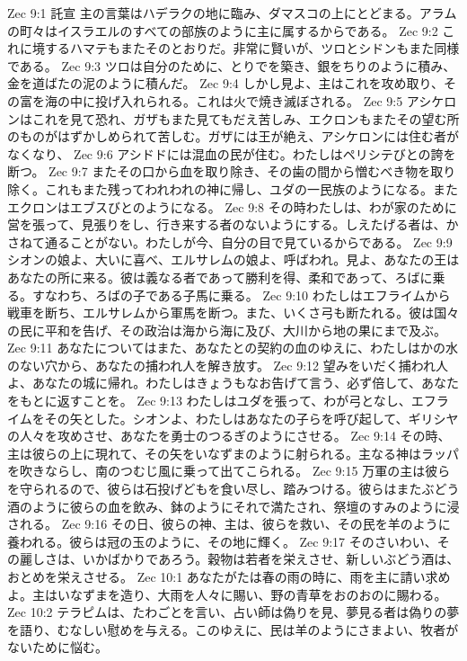 Zec 9:1  託宣 主の言葉はハデラクの地に臨み、ダマスコの上にとどまる。アラムの町々はイスラエルのすべての部族のように主に属するからである。
Zec 9:2  これに境するハマテもまたそのとおりだ。非常に賢いが、ツロとシドンもまた同様である。
Zec 9:3  ツロは自分のために、とりでを築き、銀をちりのように積み、金を道ばたの泥のように積んだ。
Zec 9:4  しかし見よ、主はこれを攻め取り、その富を海の中に投げ入れられる。これは火で焼き滅ぼされる。
Zec 9:5  アシケロンはこれを見て恐れ、ガザもまた見てもだえ苦しみ、エクロンもまたその望む所のものがはずかしめられて苦しむ。ガザには王が絶え、アシケロンには住む者がなくなり、
Zec 9:6  アシドドには混血の民が住む。わたしはペリシテびとの誇を断つ。
Zec 9:7  またその口から血を取り除き、その歯の間から憎むべき物を取り除く。これもまた残ってわれわれの神に帰し、ユダの一民族のようになる。またエクロンはエブスびとのようになる。
Zec 9:8  その時わたしは、わが家のために営を張って、見張りをし、行き来する者のないようにする。しえたげる者は、かさねて通ることがない。わたしが今、自分の目で見ているからである。
Zec 9:9  シオンの娘よ、大いに喜べ、エルサレムの娘よ、呼ばわれ。見よ、あなたの王はあなたの所に来る。彼は義なる者であって勝利を得、柔和であって、ろばに乗る。すなわち、ろばの子である子馬に乗る。
Zec 9:10  わたしはエフライムから戦車を断ち、エルサレムから軍馬を断つ。また、いくさ弓も断たれる。彼は国々の民に平和を告げ、その政治は海から海に及び、大川から地の果にまで及ぶ。
Zec 9:11  あなたについてはまた、あなたとの契約の血のゆえに、わたしはかの水のない穴から、あなたの捕われ人を解き放す。
Zec 9:12  望みをいだく捕われ人よ、あなたの城に帰れ。わたしはきょうもなお告げて言う、必ず倍して、あなたをもとに返すことを。
Zec 9:13  わたしはユダを張って、わが弓となし、エフライムをその矢とした。シオンよ、わたしはあなたの子らを呼び起して、ギリシヤの人々を攻めさせ、あなたを勇士のつるぎのようにさせる。
Zec 9:14  その時、主は彼らの上に現れて、その矢をいなずまのように射られる。主なる神はラッパを吹きならし、南のつむじ風に乗って出てこられる。
Zec 9:15  万軍の主は彼らを守られるので、彼らは石投げどもを食い尽し、踏みつける。彼らはまたぶどう酒のように彼らの血を飲み、鉢のようにそれで満たされ、祭壇のすみのように浸される。
Zec 9:16  その日、彼らの神、主は、彼らを救い、その民を羊のように養われる。彼らは冠の玉のように、その地に輝く。
Zec 9:17  そのさいわい、その麗しさは、いかばかりであろう。穀物は若者を栄えさせ、新しいぶどう酒は、おとめを栄えさせる。
Zec 10:1  あなたがたは春の雨の時に、雨を主に請い求めよ。主はいなずまを造り、大雨を人々に賜い、野の青草をおのおのに賜わる。
Zec 10:2  テラピムは、たわごとを言い、占い師は偽りを見、夢見る者は偽りの夢を語り、むなしい慰めを与える。このゆえに、民は羊のようにさまよい、牧者がないために悩む。
